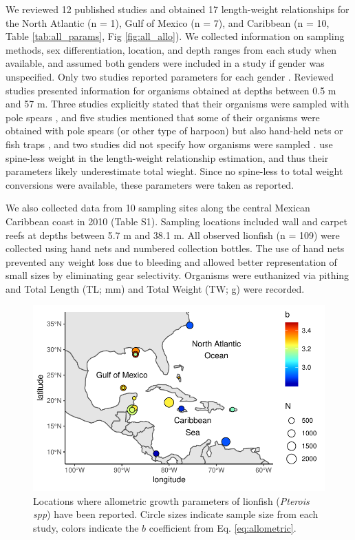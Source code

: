 \documentclass[fleqn,10pt,lineno]{wlpeerj} %
\begin{document}
We reviewed 12 published studies and obtained 17 length-weight
relationships for the North Atlantic (n = 1), Gulf of Mexico (n = 7),
and Caribbean (n = 10, Table \ref{tab:all_params}, Fig
\ref{fig:all_allo}). We collected information on sampling methods, sex
differentiation, location, and depth ranges from each study when
available, and assumed both genders were included in a study if gender
was unspecified. Only two studies reported parameters for each gender
\citep{aguilarperera_2016,fogg_2013}. Reviewed studies presented
information for organisms obtained at depths between 0.5 m and 57 m.
Three studies explicitly stated that their organisms were sampled with
pole spears
\citep{aguilarperera_2016,chin_2016,dahl_2014,sabidoitz_2016}, and five
studies mentioned that some of their organisms were obtained with pole
spears (or other type of harpoon) but also hand-held nets or fish traps
\citep{sandel_2015,barbour_2011,fogg_2013,edwards_2014,sabidoitza_2016,sabidoitz_2016,toledohernndez_2014},
and two studies did not specify how organisms were sampled
\citep{deleon_2013,darling_2011}. \citet{fogg_2013} use spine-less
weight in the length-weight relationship estimation, and thus their
parameters likely underestimate total wieght. Since no spine-less to
total weight conversions were available, these parameters were taken as
reported.

We also collected data from 10 sampling sites along the central Mexican
Caribbean coast in 2010 (Table S1). Sampling locations included wall and
carpet reefs at depths between 5.7 m and 38.1 m. All observed lionfish
(n = 109) were collected using hand nets and numbered collection
bottles. The use of hand nets prevented any weight loss due to bleeding
and allowed better representation of small sizes by eliminating gear
selectivity. Organisms were euthanized via pithing and Total Length (TL;
mm) and Total Weight (TW; g) were recorded.

\begin{figure}
\centering
\includegraphics{Manuscript_files/figure-latex/unnamed-chunk-1-1.pdf}
\caption{\label{fig:map}Locations where allometric growth parameters of
lionfish (\emph{Pterois spp}) have been reported. Circle sizes indicate
sample size from each study, colors indicate the \(b\) coefficient from
Eq. \ref{eq:allometric}.}
\end{figure}
\end{document}
